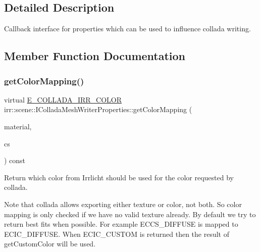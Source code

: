 \subsection{Detailed Description}
Callback interface for properties which can be used to influence collada writing. 

\subsection{Member Function Documentation}
\mbox{\label{classirr_1_1scene_1_1IColladaMeshWriterProperties_ab347c50cc9b291625d051a919d8772ab}} 
\subsubsection{\texorpdfstring{get\+Color\+Mapping()}{getColorMapping()}}
{\footnotesize\ttfamily virtual \hyperlink{namespaceirr_1_1scene_a61cba210038d6d843b81d9282f1cac7e}{E\+\_\+\+C\+O\+L\+L\+A\+D\+A\+\_\+\+I\+R\+R\+\_\+\+C\+O\+L\+OR} irr\+::scene\+::\+I\+Collada\+Mesh\+Writer\+Properties\+::get\+Color\+Mapping (\begin{DoxyParamCaption}\item[{const \hyperlink{classirr_1_1video_1_1SMaterial}{video\+::\+S\+Material} \&}]{material,  }\item[{\hyperlink{namespaceirr_1_1scene_a6204218341c6b449d879cd8367b2f8d8}{E\+\_\+\+C\+O\+L\+L\+A\+D\+A\+\_\+\+C\+O\+L\+O\+R\+\_\+\+S\+A\+M\+P\+L\+ER}}]{cs }\end{DoxyParamCaption}) const\hspace{0.3cm}{\ttfamily [pure virtual]}}



Return which color from Irrlicht should be used for the color requested by collada. 

Note that collada allows exporting either texture or color, not both. So color mapping is only checked if we have no valid texture already. By default we try to return best fits when possible. For example E\+C\+C\+S\+\_\+\+D\+I\+F\+F\+U\+SE is mapped to E\+C\+I\+C\+\_\+\+D\+I\+F\+F\+U\+SE. When E\+C\+I\+C\+\_\+\+C\+U\+S\+T\+OM is returned then the result of get\+Custom\+Color will be used. \mbox{\label{classirr_1_1scene_1_1IColladaMeshWriterProperties_a8028af2323dab63df4bdfeb292ec48cd}} 
